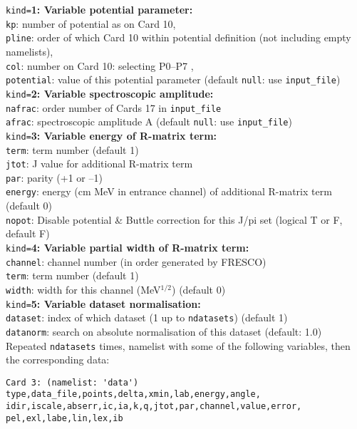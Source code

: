 \documentclass[11pt]{article}
\begin{document}
{\tt kind=}{\bf 1: Variable potential parameter:}\\
{\tt kp}: number of potential as on Card 10,\\
{\tt pline}: order of which Card 10 within potential definition (not including empty namelists),\\
{\tt col}:   number on Card 10: selecting P0--P7 ,\\
{\tt potential}: value of this potential parameter (default {\tt null}: use {\tt input\_file})\\

{\tt kind=}{\bf 2: Variable spectroscopic amplitude:}\\
{\tt nafrac}: order number of Cards 17 in {\tt input\_file}\\
{\tt afrac}: spectroscopic amplitude A (default {\tt null}: use {\tt input\_file})\\

{\tt kind=}{\bf 3: Variable energy of R-matrix term:}\\
{\tt term}: term number (default 1)\\
{\tt jtot}: J value for additional R-matrix term\\
{\tt par}: parity (+1 or --1)\\
{\tt energy}: energy (cm MeV in entrance channel) of additional R-matrix term (default 0)\\
{\tt nopot}: Disable potential \& Buttle correction for this J/pi set (logical T or F, default F)\\

{\tt kind=}{\bf 4: Variable partial width of R-matrix term:}\\
{\tt channel}: channel number (in order generated by FRESCO)\\
{\tt term}: term number (default 1)\\
{\tt width}: width for this channel (MeV$^{1/2}$) (default 0)\\

{\tt kind=}{\bf 5: Variable dataset normalisation:}\\
{\tt dataset}: index of which dataset (1 up to {\tt ndatasets}) (default 1)\\
{\tt datanorm}: search on absolute normalisation of this dataset (default: 1.0)\\

Repeated {\tt ndatasets} times, namelist with some of the following variables, then the
corresponding data:
\begin{verbatim}
Card 3: (namelist: 'data')
type,data_file,points,delta,xmin,lab,energy,angle,
idir,iscale,abserr,ic,ia,k,q,jtot,par,channel,value,error,
pel,exl,labe,lin,lex,ib
\end{verbatim}
\end{document}
